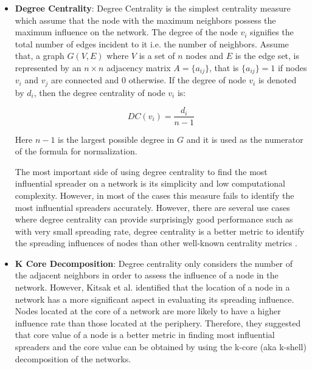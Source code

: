 \documentclass[sigconf]{acmart}
\begin{document}
\begin{itemize}
	\item \textbf{Degree Centrality}: Degree Centrality is the simplest centrality measure which assume that the node with the maximum neighbors possess the maximum influence on the network. The degree of the node $v_i$ signifies the total number of edges incident to it i.e. the number of neighbors. Assume that, a graph $G(V,E)$ where $V$ is a set of $n$ nodes and $E$ is the edge set, is represented by an $n\times n$ adjacency matrix $A = \{a_{ij}\}$, that is $\{a_{ij}\} = 1$ if nodes $v_i$ and $v_j$ are connected and $0$ otherwise. If the degree of node $v_i$ is denoted by $d_i$, then the degree centrality of node $v_i$ is:
	
	\begin{equation}
	DC(v_i) = \dfrac{d_i}{n-1}
	\label{degree centrality eq}
	\end{equation}
	
	Here $n-1$ is the largest possible degree in $G$ and it is used as the numerator of the formula for normalization.
	
	The most important side of using degree centrality to find the most influential spreader on a network is its simplicity and low computational complexity. However, in most of the cases this measure fails to identify the most influential spreaders accurately. However, there are several use cases where degree centrality can provide surprisingly good performance such as with very small spreading rate, degree centrality is a better metric to identify the spreading influences of nodes than other well-known centrality metrics \cite{klemm2012measure,liu2016locating}.
	
	\item \textbf{K Core Decomposition}: Degree centrality only considers the number of the adjacent neighbors in order to assess the influence of a node in the network. However, Kitsak et al. \cite{kitsak2010identification} identified that the location of a node in a network has a more significant aspect in evaluating its spreading influence. Nodes located at the core of a network are more likely to have a higher influence rate than those located at the periphery. Therefore, they suggested that core value of a node is a better metric in finding most influential spreaders and the core value can be obtained by using the k-core (aka k-shell) decomposition \cite{dorogovtsev2006k} of the networks. 
	

\end{itemize}
\end{document}
